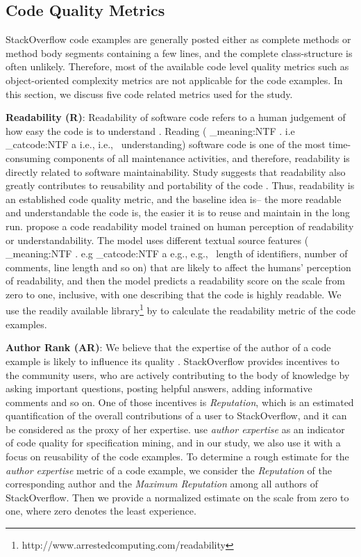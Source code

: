 \documentclass{sig-alternate}
\makeatletter
\newcommand\latinabbrev[1]{
  \peek_meaning:NTF . {%
    #1\@}%
  { \peek_catcode:NTF a {%
      #1., \@ }%
    {#1., \@}}}
\def\eg{\latinabbrev{e.g}}
\def\ie{\latinabbrev{i.e}}
\makeatother
\begin{document}
\subsection{Code Quality Metrics}
\label{sec:metrics}
StackOverflow code examples are generally posted either as complete methods or method body segments containing a few lines, and the complete class-structure is often unlikely. Therefore, most of the available code level quality metrics such as object-oriented complexity metrics are not applicable for the code examples. In this section, we discuss five code related metrics used for the study. 

\textbf{Readability (R)}: Readability of software code refers to a human judgement of how easy the code is to understand \cite{readability}. Reading (\ie\ understanding) software code is one of the most time-consuming components of all maintenance activities, and therefore, readability is directly related to software maintainability. Study suggests that readability also greatly contributes to reusability and portability of the code \cite{readability}. Thus, readability is an established code quality metric, and the baseline idea is-- the more readable and understandable the code is, the easier it is to reuse and maintain in the long run. \citet{readability} propose a code readability model trained on human perception of readability or understandability. The model uses different textual source features (\eg\ length of identifiers, number of comments, line length and so on) that are likely to affect the humans' perception of readability, and then the model predicts a readability score on the scale from zero to one, inclusive, with one describing that the code is highly readable. We use the readily available library\footnote{http://www.arrestedcomputing.com/readability} by \citet{readability} to calculate the readability metric of the code examples.
 
\textbf{Author Rank (AR)}: We believe that the expertise of the author of a code example is likely to influence its quality \cite{specmining}. StackOverflow provides incentives to the community users, who are actively contributing to the body of knowledge by asking important questions, posting helpful answers, adding informative comments and so on. One of those incentives is \emph{Reputation}, which is an estimated quantification of the overall contributions of a user to StackOverflow, and it can be considered as the proxy of her expertise. \citet{specmining} use \emph{author expertise} as an indicator of code quality for specification mining, and in our study, we also use it with a focus on reusability of the code examples. To determine a rough estimate for the \emph{author expertise} metric of a code example, we consider the \emph{Reputation} of the corresponding author and the \emph{Maximum Reputation} among all authors of StackOverflow. Then we provide a normalized estimate on the scale from zero to one, where zero denotes the least experience.
\end{document}
